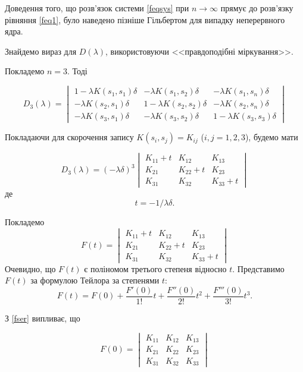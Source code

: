 \documentclass[14pt,twoside]{extreport}
\theoremstyle{mystyle}
\numberwithin{equation}{chapter}
\begin{document}
Доведення того, що розв'язок системи \eqref{feqsys} при $n \to \infty$ прямує до розв'язку рівняння \eqref{feq1}, було наведено пізніше Гільбертом для випадку неперервного ядра.

Знайдемо вираз для $D(\lambda)$, використовуючи <<правдоподібні міркування>>.

Покладемо $n = 3$. Тоді

\[
D_3(\lambda)=
\begin{vmatrix}
1-\lambda K(s_1, s_1)\delta & -\lambda K(s_1, s_2)\delta & -\lambda K(s_1, s_n)\delta\\
-\lambda K(s_2, s_1)\delta & 1-\lambda K(s_2, s_2)\delta & -\lambda K(s_2, s_n)\delta\\
-\lambda K(s_3, s_1)\delta & -\lambda K(s_3, s_2)\delta & 1-\lambda K(s_3, s_3)\delta
\end{vmatrix}
\]

Покладаючи для скорочення запису $K(s_i, s_j) = K_{ij}$ ($i, j = 1, 2, 3$), будемо мати

\begin{equation}
D_3(\lambda)=(-\lambda\delta)^3
\begin{vmatrix}
K_{11} + t & K_{12} & K_{13}\\
K_{21} & K_{22} + t & K_{23}\\
K_{31} & K_{32} & K_{33} + t
\end{vmatrix}
\end{equation}
де
\[
 t = -1/\lambda\delta.
\]

Покладемо
\begin{equation}\label{fser}
F(t)=
\begin{vmatrix}
K_{11} + t & K_{12} & K_{13}\\
K_{21} & K_{22} + t & K_{23}\\
K_{31} & K_{32} & K_{33} + t
\end{vmatrix}
\end{equation}
Очевидно, що $F(t)$ є поліномом третього степеня відносно $t$. Представимо $F(t)$ за формулою Тейлора за степенями $t$:
\begin{equation}
 F(t)=F(0)+\displaystyle \frac{F'(0)}{1!}t+\frac{F''(0)}{2!}t^{2}+\frac{F'''(0)}{3!}t^{3}.
\end{equation}

З \eqref{fser} випливає, що

\begin{equation}\label{fzero}
F(0)=
\begin{vmatrix}
K_{11} & K_{12} & K_{13}\\
K_{21} & K_{22} & K_{23}\\
K_{31} & K_{32} & K_{33}
\end{vmatrix}
\end{equation}
\end{document}
